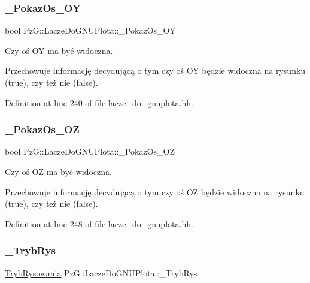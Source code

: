 \subsubsection{\texorpdfstring{\+\_\+\+Pokaz\+Os\+\_\+\+OY}{\_PokazOs\_OY}}
{\footnotesize\ttfamily bool Pz\+G\+::\+Lacze\+Do\+G\+N\+U\+Plota\+::\+\_\+\+Pokaz\+Os\+\_\+\+OY\hspace{0.3cm}{\ttfamily [protected]}}



Czy oś OY ma być widoczna. 

Przechowuje informację decydującą o tym czy oś OY będzie widoczna na rysunku ({\ttfamily true}), czy też nie ({\ttfamily false}). 

Definition at line 240 of file lacze\+\_\+do\+\_\+gnuplota.\+hh.

\mbox{\label{class_pz_g_1_1_lacze_do_g_n_u_plota_a5b0afc06dc248790d2e7475b2162e309}} 
\subsubsection{\texorpdfstring{\+\_\+\+Pokaz\+Os\+\_\+\+OZ}{\_PokazOs\_OZ}}
{\footnotesize\ttfamily bool Pz\+G\+::\+Lacze\+Do\+G\+N\+U\+Plota\+::\+\_\+\+Pokaz\+Os\+\_\+\+OZ\hspace{0.3cm}{\ttfamily [protected]}}



Czy oś OZ ma być widoczna. 

Przechowuje informację decydującą o tym czy oś OZ będzie widoczna na rysunku ({\ttfamily true}), czy też nie ({\ttfamily false}). 

Definition at line 248 of file lacze\+\_\+do\+\_\+gnuplota.\+hh.

\mbox{\label{class_pz_g_1_1_lacze_do_g_n_u_plota_a00e3a51bb47d3fb26eee875dc48215db}} 
\subsubsection{\texorpdfstring{\+\_\+\+Tryb\+Rys}{\_TrybRys}}
{\footnotesize\ttfamily \hyperlink{namespace_pz_g_aeedae1ef10c66d720f9e89de408ca4ca}{Tryb\+Rysowania} Pz\+G\+::\+Lacze\+Do\+G\+N\+U\+Plota\+::\+\_\+\+Tryb\+Rys\hspace{0.3cm}{\ttfamily [protected]}}



